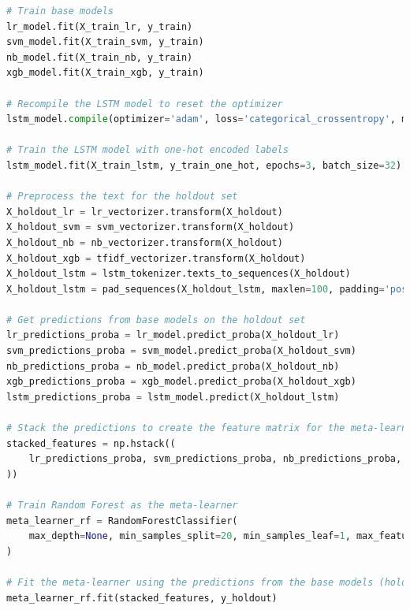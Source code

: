 \begin{tcolorbox}[colback=gray!5!white, colframe=gray!80!black, boxrule=0.5pt, title=Blending with Random Forest as Meta-Learner]
    \begin{lstlisting}[language=Python]
# Train base models
lr_model.fit(X_train_lr, y_train)
svm_model.fit(X_train_svm, y_train)
nb_model.fit(X_train_nb, y_train)
xgb_model.fit(X_train_xgb, y_train)

# Recompile the LSTM model to reset the optimizer
lstm_model.compile(optimizer='adam', loss='categorical_crossentropy', metrics=['accuracy'])

# Train the LSTM model with one-hot encoded labels
lstm_model.fit(X_train_lstm, y_train_one_hot, epochs=3, batch_size=32)  # Adjust epochs and batch size as needed

# Preprocess the text for the holdout set
X_holdout_lr = lr_vectorizer.transform(X_holdout)
X_holdout_svm = svm_vectorizer.transform(X_holdout)
X_holdout_nb = nb_vectorizer.transform(X_holdout)
X_holdout_xgb = tfidf_vectorizer.transform(X_holdout)
X_holdout_lstm = lstm_tokenizer.texts_to_sequences(X_holdout)
X_holdout_lstm = pad_sequences(X_holdout_lstm, maxlen=100, padding='post', truncating='post')

# Get predictions from base models on the holdout set
lr_predictions_proba = lr_model.predict_proba(X_holdout_lr)
svm_predictions_proba = svm_model.predict_proba(X_holdout_svm)
nb_predictions_proba = nb_model.predict_proba(X_holdout_nb)
xgb_predictions_proba = xgb_model.predict_proba(X_holdout_xgb)
lstm_predictions_proba = lstm_model.predict(X_holdout_lstm)

# Stack the predictions to create the feature matrix for the meta-learner (blending)
stacked_features = np.hstack((
    lr_predictions_proba, svm_predictions_proba, nb_predictions_proba, xgb_predictions_proba, lstm_predictions_proba
))

# Train Random Forest as the meta-learner
meta_learner_rf = RandomForestClassifier(
    max_depth=None, min_samples_split=20, min_samples_leaf=1, max_features='sqrt', bootstrap=False, random_state=42
)

# Fit the meta-learner using the predictions from the base models (holdout set)
meta_learner_rf.fit(stacked_features, y_holdout)
\end{lstlisting}
\end{tcolorbox}
